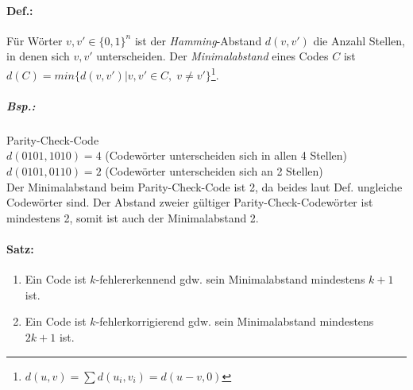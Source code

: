 \documentclass{scrreprt}
\begin{document}
\paragraph{Def.:} Für Wörter $v,v'\in \{0,1\}^n$ ist der \emph{Hamming}-Abstand $d(v,v')$ die Anzahl Stellen, in denen sich $v,v'$ unterscheiden. Der \emph{Minimalabstand} eines Codes $C$ ist $d(C)=min\{d(v,v')|v,v'\in C, \; v\not = v'\}$\footnote{$d(u,v)=\sum d(u_i, v_i)=d(u-v,0)$}.
\subparagraph{Bsp.:} Parity-Check-Code\\
$d(0101,1010)=4$ (Codewörter unterscheiden sich in allen 4 Stellen)\\
$d(0101,0110)=2$ (Codewörter unterscheiden sich an 2 Stellen)\\
Der Minimalabstand beim Parity-Check-Code ist 2, da beides laut Def. ungleiche Codewörter sind. Der Abstand zweier gültiger Parity-Check-Codewörter ist mindestens 2, somit ist auch der Minimalabstand 2.

\paragraph{Satz:}
\begin{enumerate}
\item Ein Code ist $k$-fehlererkennend gdw. sein Minimalabstand mindestens $k+1$ ist.
\item Ein Code ist $k$-fehlerkorrigierend gdw. sein Minimalabstand mindestens $2k+1$ ist.
\end{enumerate} 
\end{document}
